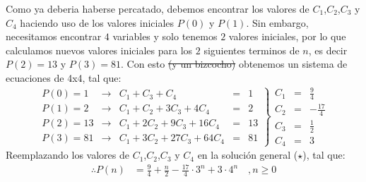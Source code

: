 \begin{solution}
Como ya deberia haberse percatado, debemos encontrar los valores de $C_1$,$C_2$,$C_3$ y $C_4$ haciendo uso de los valores iniciales $P(0)$ y $P(1)$. Sin embargo, necesitamos encontrar $4$ variables y solo tenemos $2$ valores iniciales, por lo que calculamos nuevos valores iniciales para los $2$ siguientes terminos de $n$, es decir $P(2)=13$ y $P(3)=81$. Con esto \st{(y un bizcocho)} obtenemos un sistema de ecuaciones de 4x4, tal que:
$$
  \left.
    \begin{array}{rcrrcr}
      P(0)=1 &\rightarrow& C_1 + C_3 + C_4 &=&1\\
      P(1)=2 &\rightarrow& C_1 +C_2 + 3C_3 +4C_4 &=&2\\
      P(2)=13 &\rightarrow& C_1 + 2C_2+9C_3 +16C_4&=&13\\
      P(3)=81&\rightarrow& C_1 +3C_2+27C_3+64C_4&=&81
      \end{array}
  \right\}
  \begin{array}{rcr}
       C_1&=& \frac{9}{4} \\
       C_2&=&-\frac{17}{4}  \\
       C_3&=& \frac{1}{2} \\
       C_4&=& 3
  \end{array}
$$
Reemplazando los valores de $C_1$,$C_2$,$C_3$ y $C_4$ en la solución general ($\star$), tal que:
\begin{align*}
    \therefore P(n) &= \frac{9}{4} + \frac{n}{2}-\frac{17}{4}  \cdot 3^n + 3 \cdot 4^n\quad, n\ge0
\end{align*}
\end{solution}